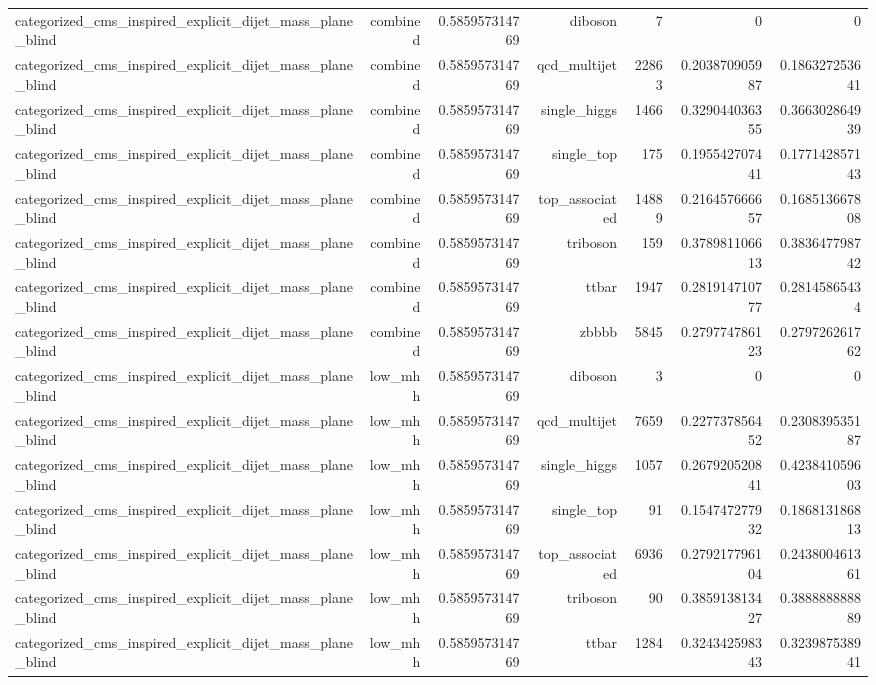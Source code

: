 \begin{table}[htbp]
{\begin{tabular}{lrrrrrr}
categorized\_cms\_inspired\_explicit\_dijet\_mass\_plane\_blind & combined & 0.585957314769 & diboson & 7 & 0 & 0 \\
categorized\_cms\_inspired\_explicit\_dijet\_mass\_plane\_blind & combined & 0.585957314769 & qcd\_multijet & 22863 & 0.203870905987 & 0.186327253641 \\
categorized\_cms\_inspired\_explicit\_dijet\_mass\_plane\_blind & combined & 0.585957314769 & single\_higgs & 1466 & 0.329044036355 & 0.366302864939 \\
categorized\_cms\_inspired\_explicit\_dijet\_mass\_plane\_blind & combined & 0.585957314769 & single\_top & 175 & 0.195542707441 & 0.177142857143 \\
categorized\_cms\_inspired\_explicit\_dijet\_mass\_plane\_blind & combined & 0.585957314769 & top\_associated & 14889 & 0.216457666657 & 0.168513667808 \\
categorized\_cms\_inspired\_explicit\_dijet\_mass\_plane\_blind & combined & 0.585957314769 & triboson & 159 & 0.378981106613 & 0.383647798742 \\
categorized\_cms\_inspired\_explicit\_dijet\_mass\_plane\_blind & combined & 0.585957314769 & ttbar & 1947 & 0.281914710777 & 0.28145865434 \\
categorized\_cms\_inspired\_explicit\_dijet\_mass\_plane\_blind & combined & 0.585957314769 & zbbbb & 5845 & 0.279774786123 & 0.279726261762 \\
categorized\_cms\_inspired\_explicit\_dijet\_mass\_plane\_blind & low\_mhh & 0.585957314769 & diboson & 3 & 0 & 0 \\
categorized\_cms\_inspired\_explicit\_dijet\_mass\_plane\_blind & low\_mhh & 0.585957314769 & qcd\_multijet & 7659 & 0.227737856452 & 0.230839535187 \\
categorized\_cms\_inspired\_explicit\_dijet\_mass\_plane\_blind & low\_mhh & 0.585957314769 & single\_higgs & 1057 & 0.267920520841 & 0.423841059603 \\
categorized\_cms\_inspired\_explicit\_dijet\_mass\_plane\_blind & low\_mhh & 0.585957314769 & single\_top & 91 & 0.154747277932 & 0.186813186813 \\
categorized\_cms\_inspired\_explicit\_dijet\_mass\_plane\_blind & low\_mhh & 0.585957314769 & top\_associated & 6936 & 0.279217796104 & 0.243800461361 \\
categorized\_cms\_inspired\_explicit\_dijet\_mass\_plane\_blind & low\_mhh & 0.585957314769 & triboson & 90 & 0.385913813427 & 0.388888888889 \\
categorized\_cms\_inspired\_explicit\_dijet\_mass\_plane\_blind & low\_mhh & 0.585957314769 & ttbar & 1284 & 0.324342598343 & 0.323987538941 \\

\end{tabular}}
\end{table}
